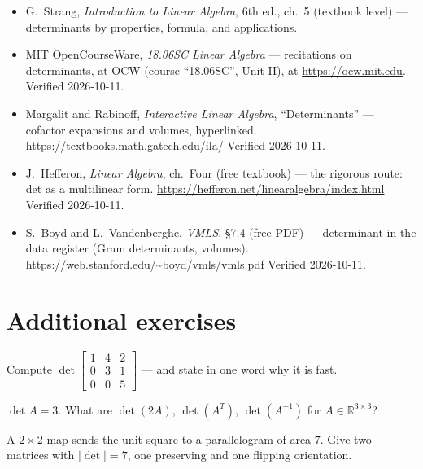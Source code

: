 \begin{itemize}
\item G.~Strang, \emph{Introduction to Linear Algebra}, 6th ed., ch.~5
(textbook level) --- determinants by properties, formula, and
applications.
\item MIT OpenCourseWare, \emph{18.06SC Linear Algebra} --- recitations
on determinants, at OCW (course ``18.06SC'', Unit II), at
\url{https://ocw.mit.edu}. Verified 2026-10-11.
\item Margalit and Rabinoff, \emph{Interactive Linear Algebra},
``Determinants'' --- cofactor expansions and volumes, hyperlinked.
\newline
\url{https://textbooks.math.gatech.edu/ila/}
Verified 2026-10-11.
\item J.~Hefferon, \emph{Linear Algebra}, ch.~Four (free textbook) ---
the rigorous route: det as a multilinear form.\newline
\url{https://hefferon.net/linearalgebra/index.html}
Verified 2026-10-11.
\item S.~Boyd and L.~Vandenberghe, \emph{VMLS}, \S7.4 (free PDF) ---
determinant in the data register (Gram determinants, volumes).
\newline
\url{https://web.stanford.edu/~boyd/vmls/vmls.pdf}
Verified 2026-10-11.
\end{itemize}

\section*{Additional exercises}

\begin{exercise}[easy]
Compute $\det\begin{bmatrix}1&4&2\\0&3&1\\0&0&5\end{bmatrix}$ --- and state
in one word why it is fast.
\end{exercise}

\begin{exercise}[easy]
$\det A=3$. What are $\det(2A)$, $\det(A^{T})$, $\det(A^{-1})$ for
$A\in\mathbb R^{3\times3}$?
\end{exercise}

\begin{exercise}[easy]
A $2\times2$ map sends the unit square to a parallelogram of area $7$.
Give two matrices with $|\det|=7$, one preserving and one flipping
orientation.
\end{exercise}

